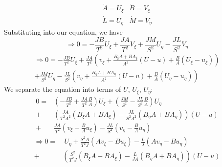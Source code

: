 \documentclass[12pt,letterpaper]{article}
\begin{document}
\begin{equation}
\begin{array}{cc}
\dot{A}=U_{\xi}&\dot{B}=V_{\xi}\\
\dot{L}=U_{\eta}&\dot{M}=V_{\eta}
\end{array}
\end{equation}
Substituting into our equation, we have 
\begin{equation}
\Rightarrow 0=
-\frac{JB}{T^2}U_{\xi}
+\frac{JA}{T^2}V_{\xi}
+\frac{JM}{S^2}U_{\eta}
-\frac{JL}{S^2}V_{\eta}
\end{equation}
\begin{equation}\begin{split}
\Rightarrow 0=
-\frac{JB}{T^2}U_{\xi}
+\frac{JA}{T^2}\left(v_{\xi}+\frac{B_\xi A+B
    A_\xi}{A^2}\left(U-u\right)+\frac{B}{A}\left(U_\xi -u_\xi\right)\right)
\\+\frac{JM}{S^2}U_{\eta}
-\frac{JL}{S^2}\left(v_{\eta}+\frac{B_\eta A+B
    A_\eta}{A^2}\left(U-u\right)+\frac{B}{A}\left(U_\eta -u_\eta\right)\right)
\end{split}
\end{equation}
We separate the equation into terms of $U$, $U_\xi$, $U_\eta$:
\begin{align}
0=&\left(-\frac{JB}{T^2}+\frac{JA}{T^2}\frac{B}{A}\right)U_\xi
+\left(\frac{JM}{S^2}-\frac{JL}{S^2}\frac{B}{A}\right)U_\eta\\
+&\left(\frac{JA}{T^2A^2}\left(B_\xi
    A+BA_\xi\right)-\frac{JL}{S^2A^2}\left(B_\eta
    A+BA_\eta\right)\right)\left(U-u\right)\\
+&\frac{JA}{T^2}\left(v_\xi-\frac{B}{A}u_\xi\right)
-\frac{JL}{S^2}\left(v_\eta-\frac{B}{A}u_\eta\right)
\end{align}
\begin{align}
\Rightarrow 0=&~U_\eta 
+\frac{S^2A}{T^2J}\left(Av_\xi-Bu_\xi\right)
-\frac{L}{J}\left(Av_\eta-Bu_\eta\right)\\
+&\left(\frac{S^2}{T^2J}\left(B_\xi
    A+BA_\xi\right)-\frac{L}{JA}\left(B_\eta
    A+BA_\eta\right)\right)\left(U-u\right)
\end{align}
\end{document}
